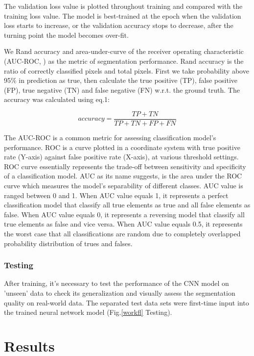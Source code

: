 \documentclass[draft,linenumbers]{agujournal2018}
\begin{document}
The validation loss value is plotted throughout training and compared with the training loss value. The model is best-trained at the epoch when the validation loss starts to increase, or the validation accuracy stops to decrease, after the turning point the model becomes over-fit. 
 
We Rand accuracy \citep{rand1971objective} and area-under-curve of the receiver operating characteristic (AUC-ROC, \citet{bradley1997use}) as the metric of segmentation performance. Rand accuracy is the ratio of correctly classified pixels and total pixels. First we take probability above 95\% in prediction as true, then calculate the true positive (TP), false positive (FP), true negative (TN) and false negative (FN) w.r.t. the ground truth. The accuracy was calculated using eq.1:
\begin{linenomath*}
\begin{equation}
    accuracy=\frac{TP+TN}{TP+TN+FP+FN}
\end{equation}
\end{linenomath*}
The AUC-ROC is a common metric for assessing classification model's performance. ROC is a curve plotted in a coordinate system with true positive rate (Y-axis) against false positive rate (X-axis), at various threshold settings. ROC curve essentially represents the trade-off between sensitivity and specificity of a classification model. AUC as its name suggests, is the area under the ROC curve which measures the model's separability of different classes. AUC value is ranged between 0 and 1. When AUC value equals 1, it represents a perfect classification model that classify all true elements as true and all false elements as false. When AUC value equals 0, it represents a reversing model that classify all true elements as false and vice versa. When AUC value equals 0.5, it represents the worst case that all classifications are random due to completely overlapped probability distribution of trues and falses.

\subsubsection{Testing}
After training, it's necessary to test the performance of the CNN model on 'unseen' data to check its generalization and visually assess the segmentation quality on real-world data. The separated test data sets were first-time input into the trained neural network model (Fig.\ref{workfl} Testing). 

\section{Results}
\end{document}

